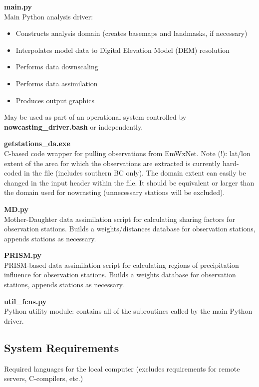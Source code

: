 \documentclass{article}
\begin{document}
\vspace{0.3cm}
\noindent \textbf{main.py}\\
Main Python analysis driver: 
\begin{itemize}[noitemsep]\vspace{-2mm}
	\item Constructs analysis domain (creates basemaps and landmasks, if necessary) 
	\item Interpolates model data to Digital Elevation Model (DEM) resolution
	\item Performs data downscaling
	\item Performs data assimilation
	\item Produces output graphics
\end{itemize}
May be used as part of an operational system controlled by \textbf{nowcasting\_driver.bash} or independently. 

\vspace{0.3cm}
\noindent \textbf{getstations\_da.exe}\\
C-based code wrapper for pulling observations from EmWxNet. Note (!): lat/lon extent of the area for which the observations are extracted is currently hard-coded in the file (includes southern BC only). The domain extent can easily be changed in the input header within the file. It should be equivalent or larger than the domain used for nowcasting (unnecessary stations will be excluded).

\vspace{0.3cm}
\noindent \textbf{MD.py}\\
Mother-Daughter data assimilation script for calculating sharing factors for observation stations. Builds a weights/distances database for observation stations, appends stations as necessary.

\vspace{0.3cm}
\noindent \textbf{PRISM.py}\\
PRISM-based data assimilation script for calculating regions of precipitation influence for observation stations. Builds a weights database for observation stations, appends stations as necessary.

\vspace{0.3cm}
\noindent \textbf{util\_fcns.py}\\
Python utility module: contains all of the subroutines called by the main Python driver. 


\subsection{System Requirements}
Required languages for the local computer (excludes requirements for remote servers, C-compilers, etc.)\\
\end{document}
